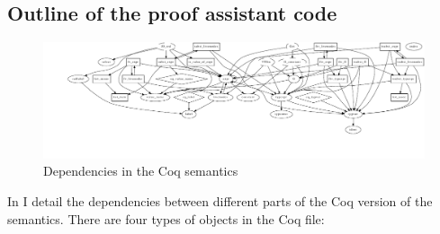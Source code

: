 \documentclass[12pt,twoside,notitlepage]{report}
\begin{document}
\subsection{Outline of the proof assistant code}
\begin{figure}
\centering
\includegraphics[width=\linewidth]{coqBaseStruct.pdf}
\caption{Dependencies in the Coq semantics}
\label{fig:coqBaseStruct}
\end{figure}
In  I detail the dependencies between different parts of the Coq version of the semantics. There are four types of objects in the Coq file:
\end{document}

